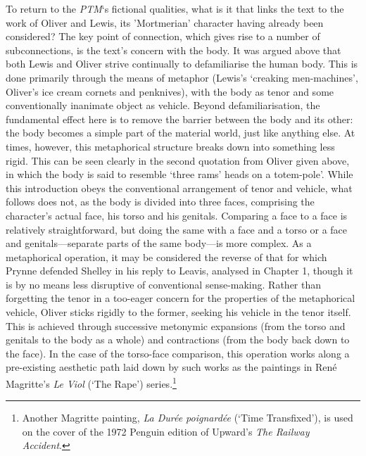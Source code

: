 \documentclass[]{article}
\begin{document}
To return to the \emph{PTM}‘s fictional qualities, what is it that links
the text to the work of Oliver and Lewis, its ’Mortmerian’ character
having already been considered? The key point of connection, which gives
rise to a number of subconnections, is the text’s concern with the body.
It was argued above that both Lewis and Oliver strive continually to
defamiliarise the human body. This is done primarily through the means
of metaphor (Lewis’s ‘creaking men-machines’, Oliver’s ice cream cornets
and penknives), with the body as tenor and some conventionally inanimate
object as vehicle. Beyond defamiliarisation, the fundamental effect here
is to remove the barrier between the body and its other: the body
becomes a simple part of the material world, just like anything else. At
times, however, this metaphorical structure breaks down into something
less rigid. This can be seen clearly in the second quotation from Oliver
given above, in which the body is said to resemble ‘three rams’ heads on
a totem-pole’. While this introduction obeys the conventional
arrangement of tenor and vehicle, what follows does not, as the body is
divided into three faces, comprising the character’s actual face, his
torso and his genitals. Comparing a face to a face is relatively
straightforward, but doing the same with a face and a torso or a face
and genitals—separate parts of the same body—is more complex. As a
metaphorical operation, it may be considered the reverse of that for
which Prynne defended Shelley in his reply to Leavis, analysed in
Chapter 1, though it is by no means less disruptive of conventional
sense-making. Rather than forgetting the tenor in a too-eager concern
for the properties of the metaphorical vehicle, Oliver sticks rigidly to
the former, seeking his vehicle in the tenor itself. This is achieved
through successive metonymic expansions (from the torso and genitals to
the body as a whole) and contractions (from the body back down to the
face). In the case of the torso-face comparison, this operation works
along a pre-existing aesthetic path laid down by such works as the
paintings in René Magritte’s \emph{Le Viol} (‘The Rape’)
series.\footnote{Another Magritte painting, \emph{La Durée poignardée}
  (‘Time Transfixed’), is used on the cover of the 1972 Penguin edition
  of Upward’s \emph{The Railway Accident}.}
\end{document}
